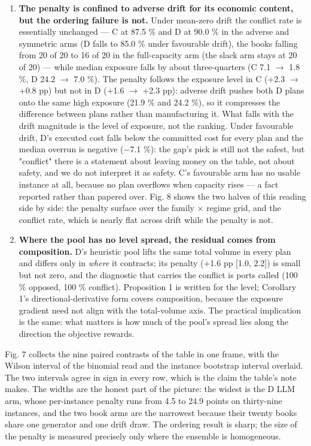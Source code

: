 \documentclass[preprint,12pt,letterpaper]{elsarticle}
\theoremstyle{definition}
\theoremstyle{plain}
\begin{document}
\begin{enumerate}
\item \textbf{The penalty is confined to adverse drift for its economic content, but the ordering failure is not.} Under mean-zero drift the conflict rate is essentially unchanged --- C at 87.5 \% and D at 90.0 \% in the adverse and symmetric arms (D falls to 85.0 \% under favourable drift), the books falling from 20 of 20 to 16 of 20 in the full-capacity arm (the slack arm stays at 20 of 20) --- while median exposure falls by about three-quarters (C 7.1 $\to$ 1.8 \%, D 24.2 $\to$ 7.0 \%). The penalty follows the exposure level in C (+2.3 $\to$ +0.8 pp) but not in D (+1.6 $\to$ +2.3 pp): adverse drift pushes both D plans onto the same high exposure (21.9 \% and 24.2 \%), so it compresses the difference between plans rather than manufacturing it. What falls with the drift magnitude is the level of exposure, not the ranking. Under favourable drift, D's executed cost falls below the committed cost for every plan and the median overrun is negative ($-$7.1 \%): the gap's pick is still not the safest, but "conflict" there is a statement about leaving money on the table, not about safety, and we do not interpret it as safety. C's favourable arm has no usable instance at all, because no plan overflows when capacity rises --- a fact reported rather than papered over. Fig. 8 shows the two halves of this reading side by side: the penalty surface over the family $\times$ regime grid, and the conflict rate, which is nearly flat across drift while the penalty is not.
\item \textbf{Where the pool has no level spread, the residual comes from composition.} D's heuristic pool lifts the same total volume in every plan and differs only in \textit{where} it contracts; its penalty (+1.6 pp [1.0, 2.2]) is small but not zero, and the diagnostic that carries the conflict is ports called (100 \% opposed, 100 \% conflict). Proposition 1 is written for the level; Corollary 1's directional-derivative form covers composition, because the exposure gradient need not align with the total-volume axis. The practical implication is the same: what matters is how much of the pool's spread lies along the direction the objective rewards.
\end{enumerate}

Fig. 7 collects the nine paired contrasts of the table in one frame, with the Wilson interval of the binomial read and the instance bootstrap interval overlaid. The two intervals agree in sign in every row, which is the claim the table's note makes. The widths are the honest part of the picture: the widest is the D LLM arm, whose per-instance penalty runs from 4.5 to 24.9 points on thirty-nine instances, and the two book arms are the narrowest because their twenty books share one generator and one drift draw. The ordering result is sharp; the size of the penalty is measured precisely only where the ensemble is homogeneous.
\end{document}
